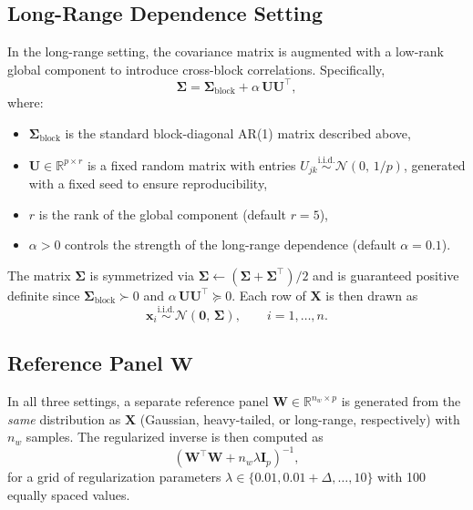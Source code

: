 \documentclass[11pt]{article}
\newcommand{\bX}{\bm{X}}
\newcommand{\bW}{\bm{W}}
\newcommand{\bSigma}{\bm{\Sigma}}
\newcommand{\bU}{\bm{U}}
\newcommand{\bI}{\bm{I}}
\begin{document}
\subsection*{Long-Range Dependence Setting}

In the long-range setting, the covariance matrix is augmented with a low-rank global component to introduce cross-block correlations. Specifically,
\[
  \bSigma = \bSigma_{\mathrm{block}} + \alpha\, \bU \bU^\top,
\]
where:
\begin{itemize}
  \item $\bSigma_{\mathrm{block}}$ is the standard block-diagonal AR(1) matrix described above,
  \item $\bU \in \mathbb{R}^{p \times r}$ is a fixed random matrix with entries $U_{jk} \overset{\text{i.i.d.}}{\sim} \mathcal{N}(0,\, 1/p)$, generated with a fixed seed to ensure reproducibility,
  \item $r$ is the rank of the global component (default $r = 5$),
  \item $\alpha > 0$ controls the strength of the long-range dependence (default $\alpha = 0.1$).
\end{itemize}
The matrix $\bSigma$ is symmetrized via $\bSigma \leftarrow (\bSigma + \bSigma^\top)/2$ and is guaranteed positive definite since $\bSigma_{\mathrm{block}} \succ 0$ and $\alpha\, \bU \bU^\top \succeq 0$. Each row of $\bX$ is then drawn as
\[
  \bm{x}_i \overset{\text{i.i.d.}}{\sim} \mathcal{N}(\bm{0},\, \bSigma), \qquad i = 1, \ldots, n.
\]

\subsection*{Reference Panel $\bW$}

In all three settings, a separate reference panel $\bW \in \mathbb{R}^{n_w \times p}$ is generated from the \emph{same} distribution as $\bX$ (Gaussian, heavy-tailed, or long-range, respectively) with $n_w$ samples. The regularized inverse is then computed as
\[
  \left(\bW^\top \bW + n_w \lambda \bI_p\right)^{-1},
\]
for a grid of regularization parameters $\lambda \in \{0.01, 0.01 + \Delta, \ldots, 10\}$ with 100 equally spaced values.
\end{document}

